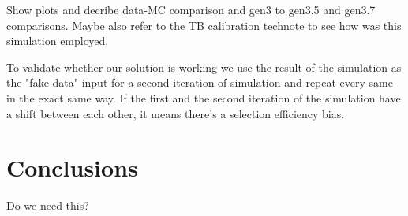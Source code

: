\documentclass[12pt]{article}
\begin{document}
Show plots and decribe data-MC comparison and gen3 to gen3.5 and gen3.7 comparisons. Maybe also refer to the TB calibration technote to see how was this simulation employed.

To validate whether our solution is working we use the result of the simulation as the "fake data" input for a second iteration of simulation and repeat every same in the exact same way. If the first and the second iteration of the simulation have a shift between each other, it means there's a selection efficiency bias.

\section{Conclusions}
Do we need this?



\end{document}
